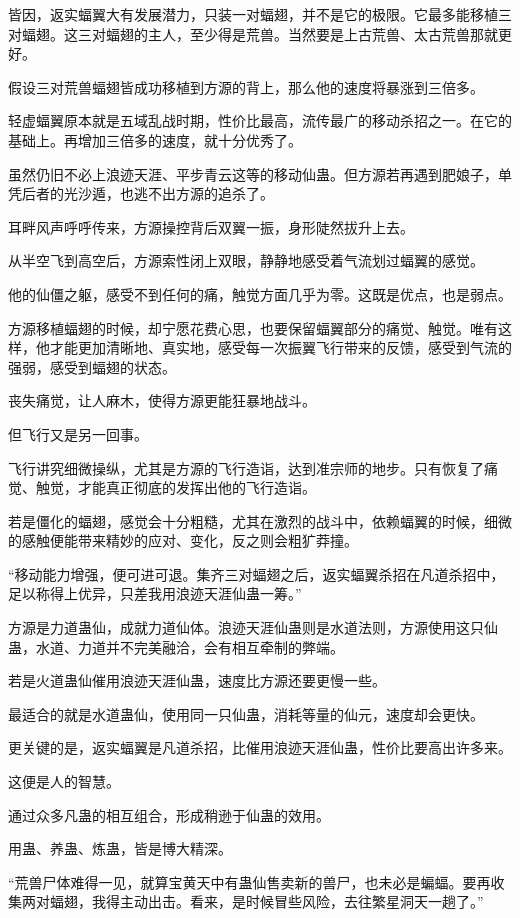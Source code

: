 \begin{this_body}
皆因，返实蝠翼大有发展潜力，只装一对蝠翅，并不是它的极限。它最多能移植三对蝠翅。这三对蝠翅的主人，至少得是荒兽。当然要是上古荒兽、太古荒兽那就更好。

假设三对荒兽蝠翅皆成功移植到方源的背上，那么他的速度将暴涨到三倍多。

轻虚蝠翼原本就是五域乱战时期，性价比最高，流传最广的移动杀招之一。在它的基础上。再增加三倍多的速度，就十分优秀了。

虽然仍旧不必上浪迹天涯、平步青云这等的移动仙蛊。但方源若再遇到肥娘子，单凭后者的光沙遁，也逃不出方源的追杀了。

耳畔风声呼呼传来，方源操控背后双翼一振，身形陡然拔升上去。

从半空飞到高空后，方源索性闭上双眼，静静地感受着气流划过蝠翼的感觉。

他的仙僵之躯，感受不到任何的痛，触觉方面几乎为零。这既是优点，也是弱点。

方源移植蝠翅的时候，却宁愿花费心思，也要保留蝠翼部分的痛觉、触觉。唯有这样，他才能更加清晰地、真实地，感受每一次振翼飞行带来的反馈，感受到气流的强弱，感受到蝠翅的状态。

丧失痛觉，让人麻木，使得方源更能狂暴地战斗。

但飞行又是另一回事。

飞行讲究细微操纵，尤其是方源的飞行造诣，达到准宗师的地步。只有恢复了痛觉、触觉，才能真正彻底的发挥出他的飞行造诣。

若是僵化的蝠翅，感觉会十分粗糙，尤其在激烈的战斗中，依赖蝠翼的时候，细微的感触便能带来精妙的应对、变化，反之则会粗犷莽撞。

“移动能力增强，便可进可退。集齐三对蝠翅之后，返实蝠翼杀招在凡道杀招中，足以称得上优异，只差我用浪迹天涯仙蛊一筹。”

方源是力道蛊仙，成就力道仙体。浪迹天涯仙蛊则是水道法则，方源使用这只仙蛊，水道、力道并不完美融洽，会有相互牵制的弊端。

若是火道蛊仙催用浪迹天涯仙蛊，速度比方源还要更慢一些。

最适合的就是水道蛊仙，使用同一只仙蛊，消耗等量的仙元，速度却会更快。

更关键的是，返实蝠翼是凡道杀招，比催用浪迹天涯仙蛊，性价比要高出许多来。

这便是人的智慧。

通过众多凡蛊的相互组合，形成稍逊于仙蛊的效用。

用蛊、养蛊、炼蛊，皆是博大精深。

“荒兽尸体难得一见，就算宝黄天中有蛊仙售卖新的兽尸，也未必是蝙蝠。要再收集两对蝠翅，我得主动出击。看来，是时候冒些风险，去往繁星洞天一趟了。”


\end{this_body}
